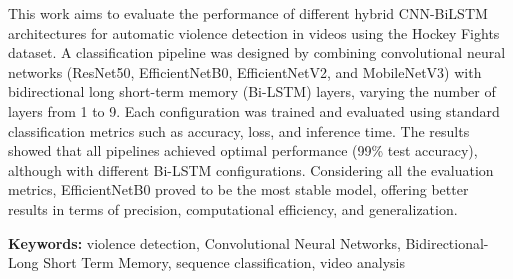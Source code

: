 This work aims to evaluate the performance of different 
hybrid CNN-BiLSTM architectures for automatic violence 
detection in videos using the Hockey Fights dataset. A 
classification pipeline was designed by combining 
convolutional neural networks (ResNet50, EfficientNetB0, 
EfficientNetV2, and MobileNetV3) with bidirectional long 
short-term memory (Bi-LSTM) layers, varying the number of 
layers from 1 to 9. Each configuration was trained and 
evaluated using standard classification metrics such as 
accuracy, loss, and inference time. The results showed 
that all pipelines achieved optimal performance (99\% 
test accuracy), although with different Bi-LSTM 
configurations. Considering all the evaluation metrics, 
EfficientNetB0 proved to be the most stable model, offering 
better results in terms of precision, computational 
efficiency, and generalization.

{\bf Keywords:} violence detection, Convolutional Neural Networks, 
Bidirectional-Long Short Term Memory, 
sequence classification, video analysis